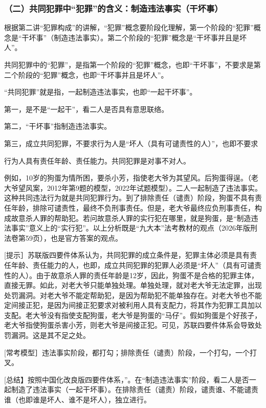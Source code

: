 \subsubsection*{（二）共同犯罪中“犯罪”的含义：制造违法事实（干坏事）}

根据第二讲“犯罪构成”的讲解，“犯罪”概念要阶段化理解，第一个阶段的“犯罪”概念是“干坏事”（制造违法事实）。第二个阶段的“犯罪”概念是“干坏事并且是坏人”。

共同犯罪中的“犯罪”，是指第一个阶段的“犯罪”概念，也即“干坏事”，不要求是第二个阶段的“犯罪”概念，也即“干坏事并且是坏人”。

“共同犯罪”就是指，一起制造违法事实，也即“一起干坏事”。

第一，是不是“一起干”，看二人是否具有意思联络。

第二，“干坏事”指制造违法事实。

第三，成立共同犯罪，不要求行为人是“坏人（具有可谴责性的人）”，也即不要求

行为人具有责任年龄、责任能力。共同犯罪是对事不对人。

例如，10岁的狗蛋为情所困，要杀小芳，指使老大爷为其望风。后狗蛋得逞。（老大爷望风案，2012年第9题的模型，2022年试题模型）。二人一起制造了违法事实。这种共同违法行为就是共同犯罪行为。到了排除责任（谴责）阶段，狗蛋不具有责任年龄，排除可谴责性，最终不负刑事责任。但是，老大爷最终应负刑事责任，构成故意杀人罪的帮助犯。若问故意杀人罪的实行犯在哪里，就是狗蛋，是“制造违法事实”意义上的“实行犯”。以上分析既是“九大本”法考教材的观点（2026年版刑法卷第59页），也是官方答案的观点。

[提示］苏联版四要件体系认为，共同犯罪的成立条件是，犯罪主体必须是具有责任年龄、责任能力的人，也即，成立共同犯罪的犯罪人必须是“坏人”（具有可谴责性的人）。由于故意杀人罪的责任年龄是12岁，因此，狗蛋不是合格的犯罪主体，直接无罪。如此，对老大爷只能单独处理。单独处理，就对老大爷无法定罪，出现处罚漏洞。对老大爷不能定帮助犯，是因为帮助犯不能单独存在。对老大爷也不能定间接正犯，是因为间接正犯要求对被利用人具有支配力，将其作为犯罪工具加以支配。老大爷没有指使支配狗蛋，老大爷是狗蛋的“马仔”。假如狗蛋是个好孩子，老大爷指使狗蛋杀害小芳，则老大爷是间接正犯。可见，苏联四要件体系会导致处罚漏洞。这是其不足之处。

[常考模型］违法事实阶段，都打勾；排除责任（谴责）阶段，一个打勾，一个打叉。


[总结】按照中国化改良版四要件体系，”。在“制造违法事实”阶段，看二人是否一起制造了违法事实（一起干坏事）。在排除责任（谴责）阶段，谴责谁、不能谴责谁（也即谁是坏人、谁不是坏人），独立进行。

